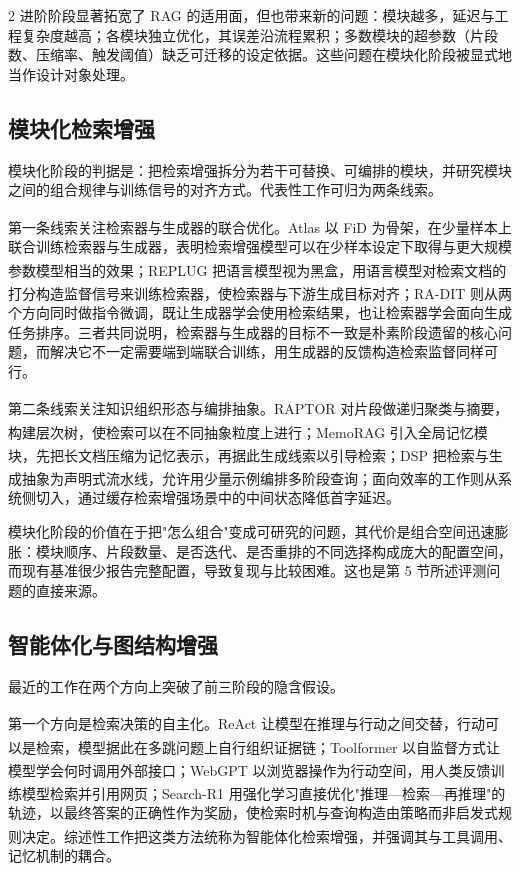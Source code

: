 \documentclass[10.5pt,compsoc,UTF8]{CjC}
\theoremstyle{mystyle}
\newcommand{\upcite}[1]{\textsuperscript{\cite{#1}}}
\begin{document}
\begin{multicols}{2}
进阶阶段显著拓宽了 RAG 的适用面，但也带来新的问题：模块越多，延迟与工程复杂度越高；各模块独立优化，其误差沿流程累积；多数模块的超参数（片段数、压缩率、触发阈值）缺乏可迁移的设定依据。这些问题在模块化阶段被显式地当作设计对象处理。

\subsection{\heiti 模块化检索增强}

模块化阶段的判据是：把检索增强拆分为若干可替换、可编排的模块，并研究模块之间的组合规律与训练信号的对齐方式。代表性工作可归为两条线索。

第一条线索关注检索器与生成器的联合优化。Atlas\upcite{izacard2022atlas} 以 FiD 为骨架，在少量样本上联合训练检索器与生成器，表明检索增强模型可以在少样本设定下取得与更大规模参数模型相当的效果；REPLUG\upcite{shi2023replug} 把语言模型视为黑盒，用语言模型对检索文档的打分构造监督信号来训练检索器，使检索器与下游生成目标对齐；RA-DIT\upcite{lin2024dit} 则从两个方向同时做指令微调，既让生成器学会使用检索结果，也让检索器学会面向生成任务排序。三者共同说明，检索器与生成器的目标不一致是朴素阶段遗留的核心问题，而解决它不一定需要端到端联合训练，用生成器的反馈构造检索监督同样可行。

第二条线索关注知识组织形态与编排抽象。RAPTOR\upcite{sarthi2024raptor} 对片段做递归聚类与摘要，构建层次树，使检索可以在不同抽象粒度上进行；MemoRAG\upcite{qian2025memorag} 引入全局记忆模块，先把长文档压缩为记忆表示，再据此生成线索以引导检索；DSP\upcite{khattab2022demonstrate} 把检索与生成抽象为声明式流水线，允许用少量示例编排多阶段查询；面向效率的工作\upcite{jin2024ragcache}则从系统侧切入，通过缓存检索增强场景中的中间状态降低首字延迟。

模块化阶段的价值在于把"怎么组合"变成可研究的问题，其代价是组合空间迅速膨胀：模块顺序、片段数量、是否迭代、是否重排的不同选择构成庞大的配置空间，而现有基准很少报告完整配置，导致复现与比较困难。这也是第 5 节所述评测问题的直接来源。

\subsection{\heiti 智能体化与图结构增强}

最近的工作在两个方向上突破了前三阶段的隐含假设。

第一个方向是检索决策的自主化。ReAct\upcite{yao2023react} 让模型在推理与行动之间交替，行动可以是检索，模型据此在多跳问题上自行组织证据链；Toolformer\upcite{schick2023toolformer} 以自监督方式让模型学会何时调用外部接口；WebGPT\upcite{nakano2021webgpt} 以浏览器操作为行动空间，用人类反馈训练模型检索并引用网页；Search-R1\upcite{jin2025search} 用强化学习直接优化"推理—检索—再推理"的轨迹，以最终答案的正确性作为奖励，使检索时机与查询构造由策略而非启发式规则决定。综述性工作\upcite{singh2025agentic}把这类方法统称为智能体化检索增强，并强调其与工具调用、记忆机制的耦合。


\end{multicols}
\end{document}
